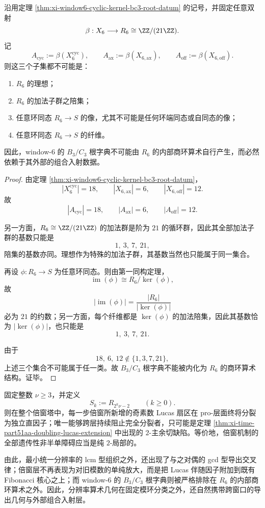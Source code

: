 \begin{theorem}\label{thm:xi-time-part51aa-window6-root-dictionary-externality}
沿用定理 \ref{thm:xi-window6-cyclic-kernel-bc3-root-datum} 的记号，并固定任意双射
\[
\beta:X_6\longrightarrow R_6\cong \ZZ/(21\ZZ).
\]
记
\[
A_{\mathrm{cyc}}:=\beta(X_6^{\mathrm{cyc}}),
\qquad
A_{\mathrm{ax}}:=\beta(X_{6,\mathrm{ax}}),
\qquad
A_{\mathrm{off}}:=\beta(X_{6,\mathrm{off}}).
\]
则这三个子集都不可能是：
\begin{enumerate}
  \item \(R_6\) 的理想；
  \item \(R_6\) 的加法子群之陪集；
  \item 任意环同态 \(R_6\to S\) 的像，尤其不可能是任何环端同态或自同态的像；
  \item 任意环同态 \(R_6\to S\) 的纤维。
\end{enumerate}
因此，window-\(6\) 的 \(B_3/C_3\) 根字典不可能由 \(R_6\) 的内部商环算术自行产生，而必然依赖于其外部的组合入射数据。
\end{theorem}
\begin{proof}
由定理 \ref{thm:xi-window6-cyclic-kernel-bc3-root-datum}，
\[
|X_6^{\mathrm{cyc}}|=18,
\qquad
|X_{6,\mathrm{ax}}|=6,
\qquad
|X_{6,\mathrm{off}}|=12.
\]
故
\[
|A_{\mathrm{cyc}}|=18,
\qquad
|A_{\mathrm{ax}}|=6,
\qquad
|A_{\mathrm{off}}|=12.
\]

另一方面，\(R_6\cong \ZZ/(21\ZZ)\) 的加法群是阶为 \(21\) 的循环群，因此其全部加法子群的基数只能是
\[
1,\ 3,\ 7,\ 21,
\]
陪集的基数亦同。理想作为特殊的加法子群，其基数当然也只能属于同一集合。

再设 \(\phi:R_6\to S\) 为任意环同态。则由第一同构定理，
\[
\operatorname{im}(\phi)\cong R_6/\ker(\phi),
\]
故
\[
|\operatorname{im}(\phi)|
=
\frac{|R_6|}{|\ker(\phi)|}
\]
必为 \(21\) 的约数；另一方面，每个纤维都是 \(\ker(\phi)\) 的加法陪集，因此其基数恰为 \(|\ker(\phi)|\)，也只能是
\[
1,\ 3,\ 7,\ 21.
\]

由于
\[
18,\ 6,\ 12\notin \{1,3,7,21\},
\]
上述三个集合不可能属于任一类。故 \(B_3/C_3\) 根字典不能被内化为 \(R_6\) 的商环算术结构。证毕。
\end{proof}

\begin{conjecture}\label{conj:xi-time-part51aa-doubling-tower-two-local-obstruction}
固定整数 \(\nu\ge 3\)，并定义
\[
S_k:=R_{2^k\nu-2}
\qquad(k\ge 0).
\]
则在整个倍窗塔中，每一步倍窗所新增的奇素数 Lucas 扇区在 pro-层面终将分裂为独立直因子；唯一能够跨层持续阻止完全分裂者，只可能是定理 \ref{thm:xi-time-part51aa-doubling-lucas-extension} 中出现的 \(2\)-主余切缺陷。等价地，倍窗机制的全部遗传性非半单障碍应当是纯 \(2\)-局部的。
\end{conjecture}

由此，最小统一分辨率的 lcm 型组织之外，还出现了与之对偶的 gcd 型导出交叉律；倍窗层不再表现为对旧模数的单纯放大，而是把 Lucas 伴随因子附加到既有 Fibonacci 核心之上；而 window-\(6\) 的 \(B_3/C_3\) 根字典则被严格排除在 \(R_6\) 的内部商环算术之外。因此，分辨率算术几何在固定模环分类之外，还自然携带跨窗口的导出几何与外部组合入射层。

\endinput
